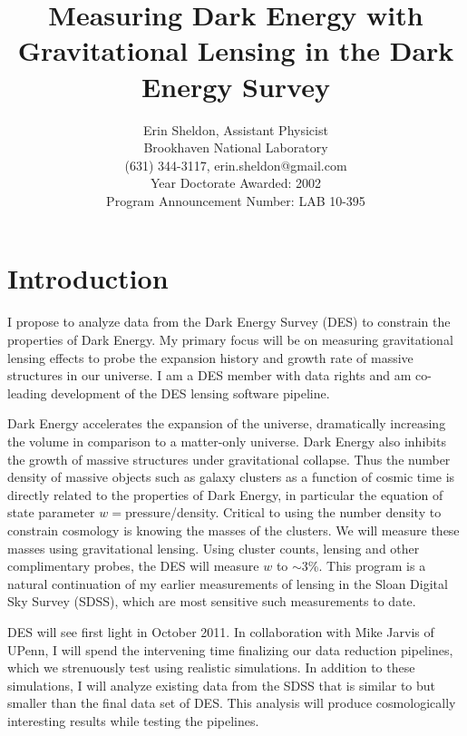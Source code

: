 \documentclass[12pt]{article}
\begin{document}
\title{Measuring Dark Energy with Gravitational Lensing in the Dark Energy Survey}
\author{Erin Sheldon, Assistant Physicist\\
Brookhaven National Laboratory\\
(631) 344-3117, erin.sheldon@gmail.com\\
Year Doctorate Awarded: 2002\\
Program Announcement Number: LAB 10-395}

\date{}
\maketitle

\section{Introduction}
I propose to analyze data from the Dark Energy Survey (DES) to constrain the
properties of Dark Energy.  My primary focus will be on measuring gravitational
lensing effects to probe the expansion history and growth rate of massive
structures in our universe.  I am a DES member with data rights and am co-leading 
development of the DES lensing software pipeline.

Dark Energy accelerates the expansion of the universe, dramatically increasing
the volume in comparison to a matter-only universe.  Dark Energy also inhibits
the growth of massive structures under gravitational collapse.  Thus the number
density of massive objects such as galaxy clusters as a function of cosmic time
is directly related to the properties of Dark Energy, in particular the
equation of state parameter $w=$pressure/density.  Critical to using the number
density to constrain cosmology is knowing the masses of the clusters. We will
measure these masses using gravitational lensing.  Using cluster counts,
lensing and other complimentary probes, the DES will measure $w$ to $\sim$3\%.
This program is a natural continuation of my earlier measurements of lensing in
the Sloan Digital Sky Survey (SDSS), which are most sensitive such measurements
to date.

DES will see first light in October 2011.  In collaboration with Mike Jarvis of
UPenn, I will spend the intervening time finalizing our data reduction
pipelines, which we strenuously test using realistic simulations.  In addition
to these simulations, I will analyze existing data from the SDSS that is
similar to but smaller than the final data set of DES.  This analysis will
produce cosmologically interesting results while testing the pipelines.
\end{document}
